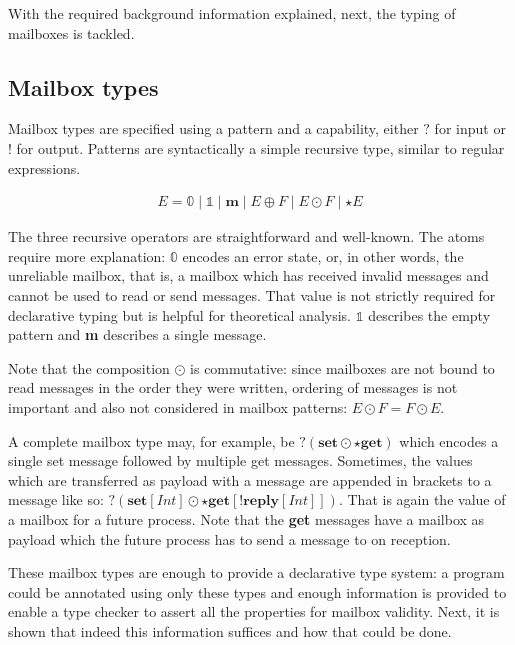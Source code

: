 With the required background information explained, next, the typing of mailboxes is tackled.

\subsection{Mailbox types}

Mailbox types are specified using a pattern and a capability, either $?$ for input or $!$ for output. Patterns are syntactically a simple recursive type, similar to regular expressions.

\begin{align*}
    E = \mathbb{0} \mid \mathbb{1} \mid \textbf{m} \mid E \oplus F \mid E \odot F \mid \star E
\end{align*}

The three recursive operators are straightforward and well-known. The atoms require more explanation: $\mathbb{0}$ encodes an error state, or, in other words, the unreliable mailbox, that is, a mailbox which has received invalid messages and cannot be used to read or send messages. That value is not strictly required for declarative typing but is helpful for theoretical analysis. $\mathbb{1}$ describes the empty pattern and \textbf{m} describes a single message.

Note that the composition $\odot$ is commutative: since mailboxes are not bound to read messages in the order they were written, ordering of messages is not important and also not considered in mailbox patterns: $E \odot F = F \odot E$.

A complete mailbox type may, for example, be $?(\textbf{set} \odot \star \textbf{get})$ which encodes a single set message followed by multiple get messages. Sometimes, the values which are transferred as payload with a message are appended in brackets to a message like so: $?(\textbf{set}[Int] \odot \star \textbf{get}[!\textbf{reply}[Int]])$. That is again the value of a mailbox for a future process. Note that the \textbf{get} messages have a mailbox as payload which the future process has to send a message to on reception. 

These mailbox types are enough to provide a declarative type system: a program could be annotated using only these types and enough information is provided to enable a type checker to assert all the properties for mailbox validity. Next, it is shown that indeed this information suffices and how that could be done.

